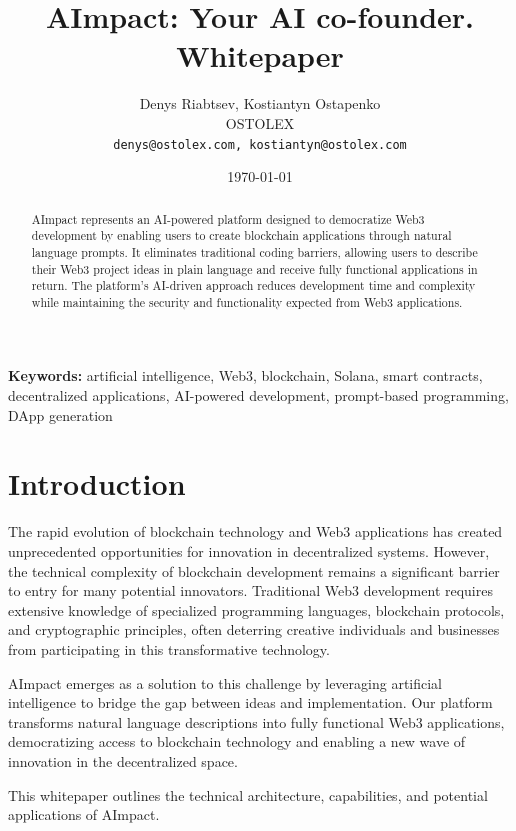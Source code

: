 \documentclass[12pt,a4paper]{article}
\title{AImpact: Your AI co-founder. Whitepaper}
\author{Denys Riabtsev, Kostiantyn Ostapenko \\ OSTOLEX \\ \texttt{denys@ostolex.com, kostiantyn@ostolex.com}}
\date{\today}
\begin{document}
\maketitle

\begin{abstract}
AImpact represents an AI-powered platform designed to democratize Web3 development by enabling users to create blockchain applications through natural language prompts. It eliminates traditional coding barriers, allowing users to describe their Web3 project ideas in plain language and receive fully functional applications in return. The platform's AI-driven approach reduces development time and complexity while maintaining the security and functionality expected from Web3 applications. 
\end{abstract}

\noindent\textbf{Keywords:} artificial intelligence, Web3, blockchain, Solana, smart contracts, decentralized applications, AI-powered development, prompt-based programming, DApp generation

\newpage

\tableofcontents
\newpage

\section{Introduction}
\label{sec:introduction}

The rapid evolution of blockchain technology and Web3 applications has created unprecedented opportunities for innovation in decentralized systems. However, the technical complexity of blockchain development remains a significant barrier to entry for many potential innovators. Traditional Web3 development requires extensive knowledge of specialized programming languages, blockchain protocols, and cryptographic principles, often deterring creative individuals and businesses from participating in this transformative technology.

AImpact emerges as a solution to this challenge by leveraging artificial intelligence to bridge the gap between ideas and implementation. Our platform transforms natural language descriptions into fully functional Web3 applications, democratizing access to blockchain technology and enabling a new wave of innovation in the decentralized space.

This whitepaper outlines the technical architecture, capabilities, and potential applications of AImpact.
\end{document}
